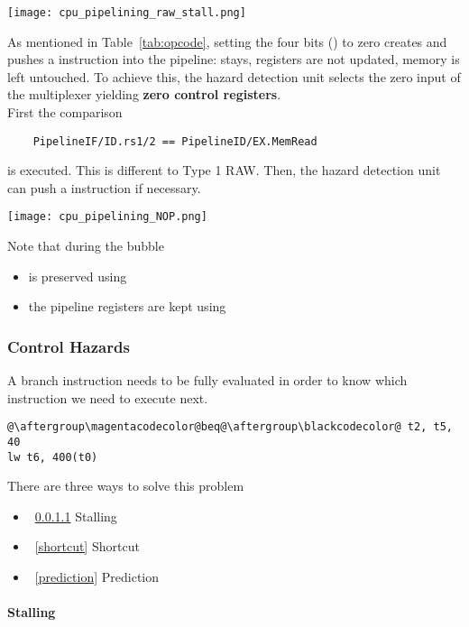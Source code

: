 \texttt{[image: cpu\_pipelining\_raw\_stall.png]}

\newpar{}
As mentioned in Table~\ref{tab:opcode}, setting the four bits () to zero creates and pushes a  instruction into the pipeline:  stays, registers are not updated, memory is left untouched. To achieve this, the hazard detection unit selects the zero input of the multiplexer yielding \textbf{zero control registers}.\\
First the comparison
\begin{lstlisting}
    PipelineIF/ID.rs1/2 == PipelineID/EX.MemRead
\end{lstlisting}
is executed. This is different to Type 1 RAW. Then, the hazard detection unit can push a  instruction if necessary.
\begin{center}
    \texttt{[image: cpu\_pipelining\_NOP.png]}
\end{center}
Note that during the bubble
\begin{itemize}
    \item {} is preserved using 
    \item the pipeline registers are kept using 
\end{itemize}

\subsubsection{Control Hazards}\label{control hazards}

A branch instruction needs to be fully evaluated in order to know which instruction we need to execute next.

\begin{lstlisting}[escapechar=@]
@\aftergroup\magentacodecolor@beq@\aftergroup\blackcodecolor@ t2, t5, 40
lw t6, 400(t0)
\end{lstlisting}

There are three ways to solve this problem
\begin{itemize}
    \item~\ref{contr_stalling} Stalling
    \item~\ref{shortcut} Shortcut
    \item~\ref{prediction} Prediction
\end{itemize}

\paragraph{Stalling}\label{contr_stalling}

